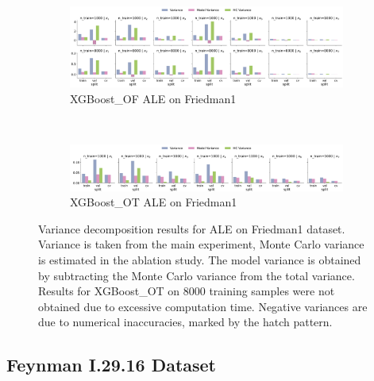 \documentclass[runningheads]{llncs}
\begin{document}
\begin{figure}[htbp]
    \centering
    \begin{subfigure}[b]{\textwidth}
        \includegraphics[width=\textwidth]{img/Friedman1-all/variance_decomposition_ale_XGBoost_OF.png}
        \caption{XGBoost\_OF ALE on Friedman1}
    \end{subfigure}
    \\[10pt]
    \vfill
    \begin{subfigure}[b]{\textwidth}
        \includegraphics[width=\textwidth]{img/Friedman1-all/variance_decomposition_ale_XGBoost_OT.png}
        \caption{XGBoost\_OT ALE on Friedman1}
    \end{subfigure}
    \caption{Variance decomposition results for ALE on Friedman1 dataset. Variance is taken from the
        main experiment, Monte Carlo variance is estimated in the ablation study. The model variance is
        obtained by subtracting the Monte Carlo variance from the total variance. Results for XGBoost\_OT
        on 8000 training samples were not obtained due to excessive computation time. Negative variances are
        due to numerical inaccuracies, marked by the hatch pattern.}
    \label{fig:ale-variance-decomp-friedman1}  %
\end{figure}

\clearpage
\subsection{Feynman I.29.16 Dataset}
\end{document}
